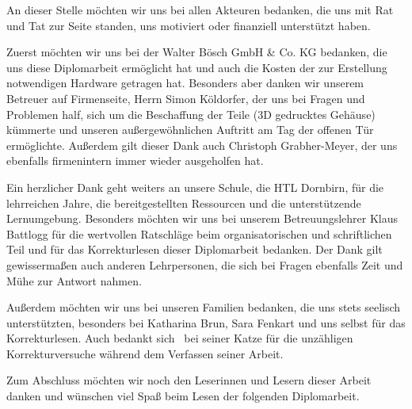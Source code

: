 \noindent An dieser Stelle möchten wir uns bei allen Akteuren bedanken, die uns mit Rat und Tat zur Seite standen, uns motiviert oder finanziell unterstützt haben.

Zuerst möchten wir uns bei der Walter Bösch GmbH \& Co. KG bedanken, die uns diese Diplomarbeit ermöglicht hat und auch die Kosten der zur Erstellung notwendigen Hardware getragen hat. Besonders aber danken wir unserem Betreuer auf Firmenseite, Herrn Simon Köldorfer, der uns bei Fragen und Problemen half, sich um die Beschaffung der Teile (\zB 3D gedrucktes Gehäuse) kümmerte und unseren außergewöhnlichen Auftritt am Tag der offenen Tür ermöglichte. Außerdem gilt dieser Dank auch Christoph Grabher-Meyer, der uns ebenfalls firmenintern immer wieder ausgeholfen hat.

Ein herzlicher Dank geht weiters an unsere Schule, die HTL Dornbirn, für die lehrreichen Jahre, die bereitgestellten Ressourcen und die unterstützende Lernumgebung. Besonders möchten wir uns bei unserem Betreuungslehrer Klaus Battlogg für die wertvollen Ratschläge beim organisatorischen und schriftlichen Teil und für das Korrekturlesen dieser Diplomarbeit bedanken. Der Dank gilt gewissermaßen auch anderen Lehrpersonen, die sich bei Fragen ebenfalls Zeit und Mühe zur Antwort nahmen.

Außerdem möchten wir uns bei unseren Familien bedanken, die uns stets seelisch unterstützten, besonders bei Katharina Brun, Sara Fenkart und uns selbst für das Korrekturlesen. Auch bedankt sich \pezze\ bei seiner Katze für die unzähligen Korrekturversuche während dem Verfassen seiner Arbeit.

Zum Abschluss möchten wir noch den Leserinnen und Lesern dieser Arbeit danken und wünschen viel Spaß beim Lesen der folgenden Diplomarbeit.